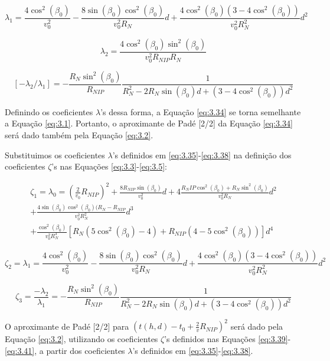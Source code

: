 \begin{equation}
\label{eq:6.36}
 \lambda_1=\frac{4\cos^2(\beta_0)}{v_0^2}-\frac{8\sin(\beta_0)\cos^2(\beta_0)}{v_0^2R_N}d+\frac{4\cos^2(\beta_0)(3-4\cos^2(\beta_0))}{v_0^2R_N^2}d^2
\end{equation}

\begin{equation}
\label{eq:6.37}
\lambda_2=\frac{4\cos^2(\beta_0)\sin^2(\beta_0)}{v_0^2R_{NIP}R_N}
\end{equation}

\begin{equation}
\label{eq:6.38}
 [-\lambda_2/\lambda_1]=-\frac{R_N\sin^2(\beta_0)}{R_{NIP}}\frac{1}{R_N^2-2R_N\sin(\beta_0)d+(3-4\cos^2(\beta_0))d^2}
\end{equation}

Definindo os coeficientes $\lambda$'s dessa forma, a Equação \ref{eq:3.34} se torna semelhante a
Equação \ref{eq:3.1}. Portanto,
o aproximante de Padé [2/2] da Equação \ref{eq:3.34} será dado também pela Equação \ref{eq:3.2}.

Substituimos os coeficientes $\lambda$'s definidos em \ref{eq:3.35}-\ref{eq:3.38} na definição dos coeficientes $\zeta$'s
nas Equações \ref{eq:3.3}-\ref{eq:3.5}:

\begin{multline}
\label{eq:6.39}
 \zeta_1=\lambda_0=(\frac{2}{v_0}R_{NIP})^2+\frac{8R_{NIP}\sin(\beta_0)}{v_0^2}d+4\frac{R_NIP\cos^2(\beta_0)+R_N\sin^2(\beta_0)}{v_0^2R_N}d^2 \\
 +\frac{4\sin(\beta_0)\cos^2(\beta_0)(R_N-R_{NIP}}{v_0^2R_N^2}d^3 \\
 +\frac{\cos^2(\beta_0)}{v_0^2R_N^3}[R_N(5\cos^2(\beta_0)-4)+R_{NIP}(4-5\cos^2(\beta_0))]d^4
\end{multline}

\begin{equation}
\label{eq:6.40}
 \zeta_2=\lambda_1=\frac{4\cos^2(\beta_0)}{v_0^2}-\frac{8\sin(\beta_0)\cos^2(\beta_0)}{v_0^2R_N}d+\frac{4\cos^2(\beta_0)(3-4\cos^2(\beta_0))}{v_0^2R_N^2}d^2
\end{equation}

\begin{equation}
\label{eq:6.41}
 \zeta_3=\frac{-\lambda_2}{\lambda_1}=-\frac{R_N\sin^2(\beta_0)}{R_{NIP}}\frac{1}{R_N^2-2R_N\sin(\beta_0)d+(3-4\cos^2(\beta_0))d^2} 
\end{equation}

O aproximante de Padé [2/2] para $(t(h,d)-t_0+\frac{2}{v}R_{NIP})^2$ será dado pela Equação \ref{eq:3.2},
utilizando os coeficientes $\zeta$'s definidos nas Equações \ref{eq:3.39}-\ref{eq:3.41}, a partir dos coeficientes 
$\lambda$'s definidos em \ref{eq:3.35}-\ref{eq:3.38}.

